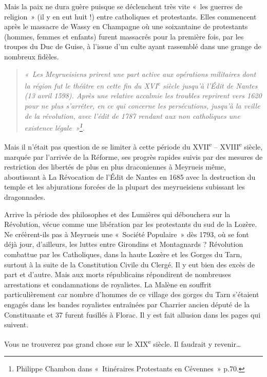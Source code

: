Mais la paix ne dura guère puisque se déclenchent très vite «~les guerres de religion~» (il y en eut huit !) entre catholiques et protestants. Elles commencent après le massacre de Wassy en Champagne où une soixantaine de protestants (hommes, femmes et enfants) furent massacrés pour la première fois, par les troupes du Duc de Guise, à l’issue d’un culte ayant rassemblé dans une grange de nombreux fidèles.

\begin{quote}
\itshape
«~Les Meyrueisiens prirent une part active aux opérations militaires dont la région fut le théâtre en cette fin du XVI\textsuperscript{e} siècle jusqu’à l’Édit de Nantes (13 avril 1598). Après une relative accalmie les troubles reprirent vers 1620 pour ne plus s’arrêter, en ce qui concerne les persécutions, jusqu’à la veille de la révolution, avec l’édit de 1787 rendant aux non catholiques une existence légale~»\footnote{Philippe Chambon dans «~Itinéraires Protestants en Cévennes~» p.70.}.
\end{quote}


Mais il n’était pas question de se limiter à cette période du XVII\textsuperscript{e} -- XVIII\textsuperscript{e} siècle, marquée par l’arrivée de la Réforme, ses progrès rapides suivis par des mesures de restriction des libertés de plus en plus draconiennes à Meyrueis même, aboutissant à La Révocation de l’Édit de Nantes en 1685 avec la destruction du temple et les abjurations forcées de la plupart des meyrueisiens subissant les dragonnades.

Arrive la période des philosophes et des Lumières qui débouchera sur la Révolution, vécue comme une libération par les protestants du sud de la Lozère. Ne créèrent-ils pas à Meyrueis une «~Société Populaire~» dès 1793, où se font déjà jour, d’ailleurs, les luttes entre Girondins et Montagnards ? Révolution combattue par les Catholiques, dans la haute Lozère et les Gorges du Tarn, surtout à la suite de la Constitution Civile du Clergé. Il y eut bien des excès de part et d’autre. Mais aux morts républicains répondirent de nombreuses arrestations et condamnations de royalistes. La Malène en souffrit particulièrement car nombre d'hommes de ce village des gorges du Tarn s’étaient engagés dans les bandes royalistes entraînées par Charrier ancien député de la Constituante et 37 furent fusillés à Florac. Il y est fait allusion dans les pages qui suivent.

Vous ne trouverez pas grand chose sur le XIX\textsuperscript{e} siècle. Il faudrait y revenir…

